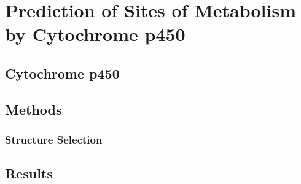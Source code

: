 \chapter{Prediction of Sites of Metabolism by Cytochrome p450}
\label{chapter:p450}

\section{Cytochrome p450}
\label{section:p450}


\section{Methods}
\label{section:p450_methods}

\subsection{Structure Selection}
\label{subsection:p450_structure_selection}

\section{Results}
\label{section:p450_results}
%

